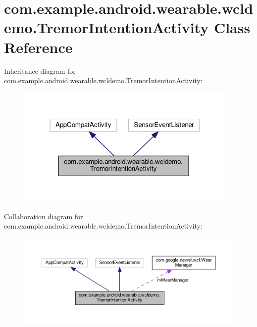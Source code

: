 \hypertarget{classcom_1_1example_1_1android_1_1wearable_1_1wcldemo_1_1TremorIntentionActivity}{}\section{com.\+example.\+android.\+wearable.\+wcldemo.\+Tremor\+Intention\+Activity Class Reference}
\label{classcom_1_1example_1_1android_1_1wearable_1_1wcldemo_1_1TremorIntentionActivity}


Inheritance diagram for com.\+example.\+android.\+wearable.\+wcldemo.\+Tremor\+Intention\+Activity\+:
\nopagebreak
\begin{figure}[H]
\begin{center}
\leavevmode
\includegraphics[width=306pt]{d9/ded/classcom_1_1example_1_1android_1_1wearable_1_1wcldemo_1_1TremorIntentionActivity__inherit__graph}
\end{center}
\end{figure}


Collaboration diagram for com.\+example.\+android.\+wearable.\+wcldemo.\+Tremor\+Intention\+Activity\+:
\nopagebreak
\begin{figure}[H]
\begin{center}
\leavevmode
\includegraphics[width=350pt]{da/d60/classcom_1_1example_1_1android_1_1wearable_1_1wcldemo_1_1TremorIntentionActivity__coll__graph}
\end{center}
\end{figure}
